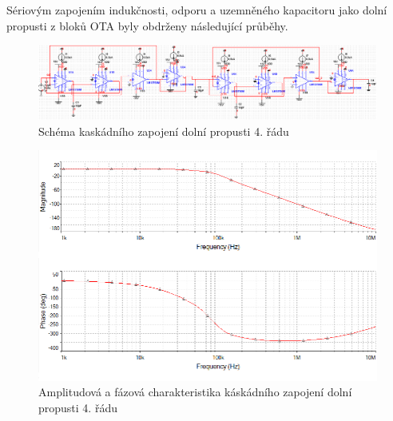 \documentclass[twoside]{article}
\begin{document}
\noindent Sériovým zapojením indukčnosti, odporu a uzemněného kapacitoru jako dolní propusti z bloků OTA byly obdrženy následující průběhy.
\begin{figure}[H]
\centering
\includegraphics[scale=0.6]{lrcx2.png}
\caption{Schéma kaskádního zapojení dolní propusti 4. řádu}
\end{figure}
\begin{figure}[H]
\centering
\includegraphics[scale=0.75]{lrcx2ampl.png}
\caption{Amplitudová a fázová charakteristika káskádního zapojení dolní propusti 4. řádu}
\end{figure}
\end{document}
